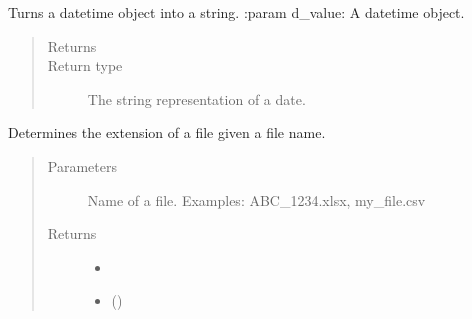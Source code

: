 \documentclass[letterpaper,10pt,english]{sphinxmanual}
\begin{document}
\begin{fulllineitems}
\label{\detokenize{index:ListManagement.utility.general.date_to_string}}
Turns a datetime object into a string.
:param d\_value: A datetime object.
\begin{quote}\begin{description}
\item[{Returns}] \leavevmode


\item[{Return type}] \leavevmode
The string representation of a date.

\end{description}\end{quote}

\end{fulllineitems}


\begin{fulllineitems}
\label{\detokenize{index:ListManagement.utility.general.determine_ext}}
Determines the extension of a file given a file name.
\begin{quote}\begin{description}
\item[{Parameters}] \leavevmode
{} \textendash{} Name of a file.
Examples: ABC\_1234.xlsx, my\_file.csv

\item[{Returns}] \leavevmode
\begin{itemize}
\item {} 

\item {} 
 ()

\end{itemize}


\end{description}\end{quote}

\end{fulllineitems}

\end{document}
